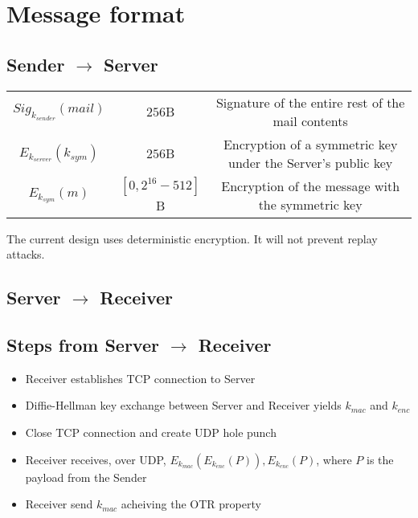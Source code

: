 \documentclass[11pt]{article}
\begin{document}

\section*{Message format}
\subsection*{Sender $\rightarrow$ Server}
\begin{tabular}{c c c}
  $Sig_{k_{sender}}\left(mail\right)$ & $256$B &
    Signature of the entire rest of the mail contents\\
  $E_{k_{server}}\left(k_{sym}\right)$ & $256$B &
    Encryption of a symmetric key under the Server's public key\\
  $E_{k_{sym}}\left(m\right)$ & $\left[0, 2^{16} - 512 \right]$B &
    Encryption of the message with the symmetric key
\end{tabular}
The current design uses deterministic encryption. It will not prevent replay
attacks.

\subsection*{Server $\rightarrow$ Receiver}

\subsection*{Steps from Server $\rightarrow$ Receiver}
\begin{itemize}
  \item Receiver establishes TCP connection to Server
  \item Diffie-Hellman key exchange between Server and Receiver yields
  $k_{mac}$ and $k_{enc}$
  \item Close TCP connection and create UDP hole punch
  \item Receiver receives, over UDP,
    $E_{k_{mac}}\left(E_{k_{enc}}\left(P\right)\right),
    E_{k_{enc}}\left(P\right)$,
    where $P$ is the payload from the Sender
  \item Receiver send $k_{mac}$ acheiving the OTR property

\end{itemize}
\end{document}
